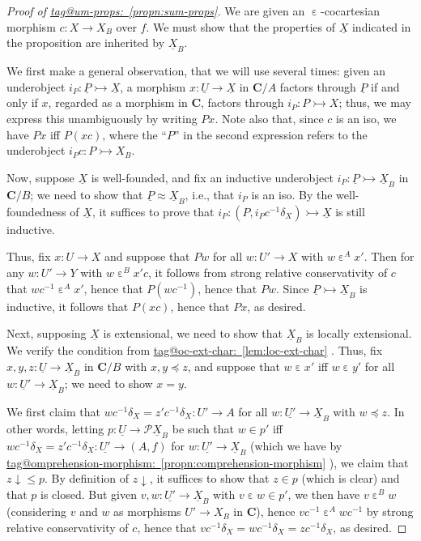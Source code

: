 \documentclass{amsart}
\makeatletter
\newcommand\bC{\mathbf{C}}
\newcommand\dwn{\mathpunct{\downarrow}}
\newcommand\ein{\mathrel{\varepsilon}}
\newcommand\I{^{-1}}
\newcommand\pow{\mathcal{P}}
\newcommand\tto{\rightarrowtail}
\newcommand\und[1]{\underline{#1}}
\newcommand\unein{{\ein}}
\newcommand\tagword[1]{\csname tag@#1\endcsname}
\def\label@tag#1:#2\@nil{#1}
\newcommand\labeltag[1]{\label@tag#1:\@nil}
\newcommand\jref[1]{%
  \texorpdfstring%
    {\hyperref[#1]{\tagword{\labeltag{#1}}~\ref*{#1}}}%
    {\tagword{\labeltag{#1}}~\ref*{#1}}%
}
\theoremstyle{definition}
\theoremstyle{remark}
\theoremstyle{plainwithref}
\makeatother
\begin{document}
\begin{proof}[Proof of \jref{propn:sum-props}] \label{proof:sum-props}
  We are given an \( \unein \)-cocartesian morphism \( c \colon X \to X_B \) over \( f \).
  We must show that the properties of \( \und X \) indicated in the proposition are inherited by \( \und X_B \).

  We first make a general observation, that we will use several times: given an underobject \( i_P \colon \und P \tto \und X \), a morphism \( x \colon \und U \to \und X \) in \( \bC / A \) factors through \( \und P \) if and only if \( x \), regarded as a morphism in \( \bC \), factors through \( i_P \colon P \tto X \); thus, we may express this unambiguously by writing \( P x \).
  Note also that, since \( c \) is an iso, we have \( P x \) iff \( P (x c) \), where the ``\( P \)'' in the second expression refers to the underobject \( i_P c \colon P \tto X_B \).

  Now, suppose \( \und X \) is well-founded, and fix an inductive underobject \( i_P \colon \und P \tto \und X_B \) in \( \bC / B \); we need to show that \( \und P \approx \und X_B \), i.e., that \( i_P \) is an iso.
  By the well-foundedness of \( \und X \), it suffices to prove that \( i_P \colon (P, i_P c\I \delta_X) \tto \und X \) is still inductive.

  Thus, fix \( x \colon U \to X \) and suppose that \( P w \) for all \( w \colon U' \to X \) with \( w \ein^A x' \).
  Then for any \( w \colon U' \to Y \) with \( w \ein^B x' c \), it follows from strong relative conservativity of \( c \) that \( w c \I \ein^A x' \), hence that \( P (w c \I) \), hence that \( P w \).
  Since \( \und P \tto \und X_B \) is inductive, it follows that \( P (x c) \), hence that \( P x \), as desired.

  Next, supposing \( \und X \) is extensional, we need to show that \( \und X_B \) is locally extensional.
  We verify the condition from \jref{lem:loc-ext-char}.
  Thus, fix \( x,y,z \colon \und U \to \und X_B \) in \( \bC / B \) with \( x, y \preceq z \), and suppose that \( w \ein x' \) iff \( w \ein y' \) for all \( w \colon \und U' \to \und X_B \); we need to show \( x = y \).

  We first claim that \( w c\I \delta_X = z' c\I \delta_X \colon U' \to A \) for all \( w \colon \und{U'} \to \und X_B \) with \( w \preceq z \).
  In other words, letting \( p \colon \und U \to \pow \und X_B \) be such that \( w \in p' \) iff \( w c\I \delta_X = z' c\I \delta_X \colon \und{U'} \to (A, f) \) for \( w \colon \und{U'} \to \und X_B \) (which we have by \jref{propn:comprehension-morphism}), we claim that \( z \dwn \le p \).
  By definition of \( z \dwn \), it suffices to show that \( z \in p \) (which is clear) and that \( p \) is closed.
  But given \( v,w \colon \und{U'} \to \und X_B \) with \( v \ein w \in p' \), we then have \( v \ein^B w \) (considering \( v \) and \( w \) as morphisms \( U' \to X_B \) in \( \bC \)), hence \( v c\I \ein^A w c\I \) by strong relative conservativity of \( c \), hence that \( v c\I \delta_X = w c \I \delta_X = z c\I \delta_X \), as desired.


\end{proof}
\end{document}
